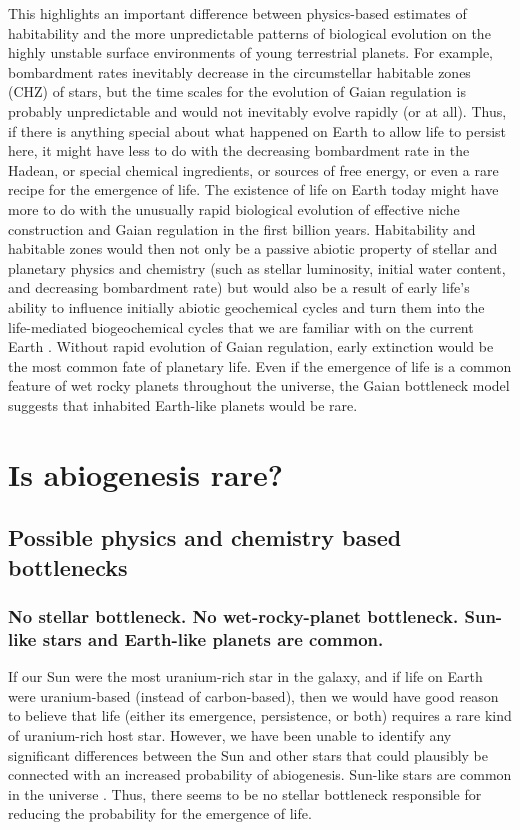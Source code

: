 This highlights an important difference between physics-based estimates of habitability
and the more unpredictable patterns of biological evolution 
on the highly unstable surface environments of young terrestrial planets. For example, bombardment rates inevitably decrease in the circumstellar habitable zones (CHZ) of stars, but  the time scales for the evolution of Gaian regulation is probably unpredictable and would not inevitably evolve rapidly (or at all). Thus, if there is anything special about what happened on Earth  to allow life to persist here, it might have less to do with the
decreasing bombardment rate in the Hadean, or special chemical ingredients, or sources of free energy, or even a rare recipe for the emergence of life.  The existence of life on Earth today might have more to do with the unusually rapid biological evolution of effective niche construction and Gaian regulation
in the first billion years. Habitability and habitable zones would then not only be a passive abiotic property of stellar and planetary physics and chemistry 
(such as stellar luminosity, initial water content, and decreasing bombardment rate) 
but would also be a result of early life's ability to influence initially abiotic geochemical cycles and turn them into the life-mediated biogeochemical cycles 
that we are familiar with on the current Earth \citep{Lenton1998,Lenton2004,Schneider2004,Falkowski2008,Kump2009}. Without rapid evolution of Gaian regulation, early extinction would be the most common fate of planetary life. Even if the emergence of life is a common feature of wet rocky planets throughout the universe, the Gaian bottleneck model suggests that inhabited Earth-like planets would be rare.

\section{Is abiogenesis rare?}
\subsection{Possible physics and chemistry based bottlenecks}
\label{sec:EmergenceBottleneck}

\subsubsection{No stellar bottleneck.  No wet-rocky-planet bottleneck. Sun-like stars and Earth-like planets are common.}
If our Sun were the most uranium-rich star in the galaxy, and if life on Earth were uranium-based (instead of carbon-based), then we would have good reason 
to believe that life (either its emergence, persistence, or both) requires a rare kind of uranium-rich host star. 
However, we have been unable to identify any significant differences between the Sun and other stars that could plausibly be connected with an
increased probability of abiogenesis. 
Sun-like stars are common in the universe  \citep{Robles2008}.
Thus, there seems to be no stellar bottleneck responsible for reducing the probability for the emergence of life.

